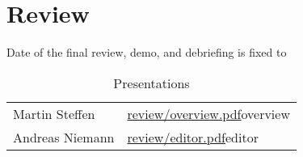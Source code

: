
\section*{Review}

Date of the final review, demo, and debriefing is fixed to

\begin{center}
\end{center}



\begin{table}[htbp]
  \centering
  \begin{tabular}{ll}
    Martin Steffen & \url{review/overview.pdf}{overview}
    \\
    Andreas Niemann & \url{review/editor.pdf}{editor}
  \end{tabular}
  \caption{Presentations}
  \label{tab:presentations}
\end{table}



